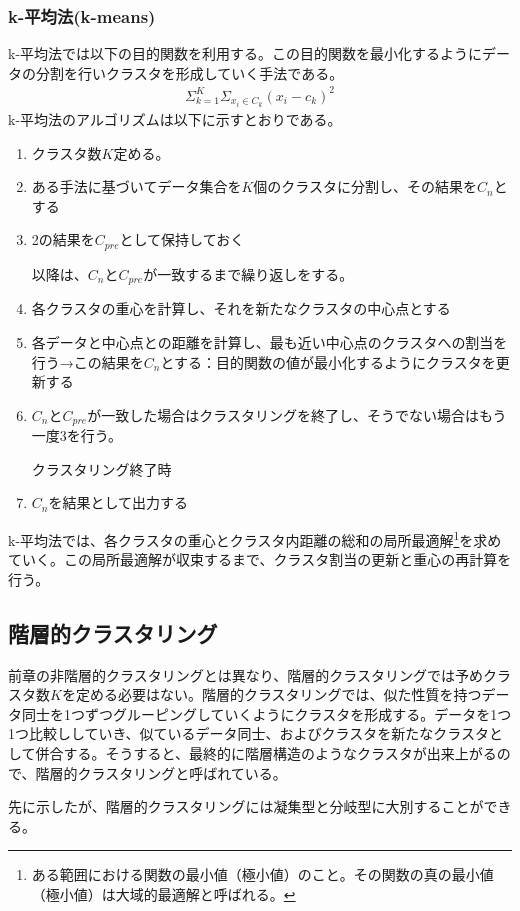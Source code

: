 \documentclass[dvipdfmx]{jsarticle}
\begin{document}
\subsubsection{k-平均法(k-means)}
k-平均法では以下の目的関数を利用する。この目的関数を最小化するようにデータの分割を行いクラスタを形成していく手法である。
\begin{gather*}
  \Sigma_{k=1}^{K}\Sigma_{x_{i}\in C_{k}}(x_{i}-c_{k})^{2}
\end{gather*}
k-平均法のアルゴリズムは以下に示すとおりである。
\begin{enumerate}
  \item クラスタ数$K$定める。
  \item ある手法に基づいてデータ集合を$K$個のクラスタに分割し、その結果を$C_{n}$とする
  \item 2の結果を$C_{pre}$として保持しておく\par
  以降は、$C_{n}$と$C_{pre}$が一致するまで繰り返しをする。
  \item 各クラスタの重心を計算し、それを新たなクラスタの中心点とする
  \item 各データと中心点との距離を計算し、最も近い中心点のクラスタへの割当を行う→この結果を$C_{n}$とする：目的関数の値が最小化するようにクラスタを更新する
  \item $C_{n}$と$C_{pre}$が一致した場合はクラスタリングを終了し、そうでない場合はもう一度3を行う。\par
  クラスタリング終了時
  \item $C_{n}$を結果として出力する
\end{enumerate}
k-平均法では、各クラスタの重心とクラスタ内距離の総和の局所最適解\footnote{ある範囲における関数の最小値（極小値）のこと。その関数の真の最小値（極小値）は大域的最適解と呼ばれる。}を求めていく。この局所最適解が収束するまで、クラスタ割当の更新と重心の再計算を行う。
\subsection{階層的クラスタリング}
前章の非階層的クラスタリングとは異なり、階層的クラスタリングでは予めクラスタ数$K$を定める必要はない。階層的クラスタリングでは、似た性質を持つデータ同士を1つずつグルーピングしていくようにクラスタを形成する。データを1つ1つ比較ししていき、似ているデータ同士、およびクラスタを新たなクラスタとして併合する。そうすると、最終的に階層構造のようなクラスタが出来上がるので、階層的クラスタリングと呼ばれている。\par
先に示したが、階層的クラスタリングには凝集型と分岐型に大別することができる。
\end{document}
